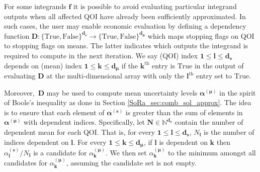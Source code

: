 \documentclass[graybox]{svmult}
\begin{document}
For some integrands $\boldsymbol{f}$ it is possible to avoid evaluating particular integrand outputs when all affected QOI have already been sufficiently approximated. In such cases, the user may enable economic evaluation by defining a dependency function $\boldsymbol{D}: \{\text{True},\text{False}\}^{\boldsymbol{d}_{\boldsymbol{s}}} \to \{\text{True},\text{False}\}^{\boldsymbol{d}_{\boldsymbol{\mu}}}$ which maps stopping flags on QOI to stopping flags on means. The latter indicates which outputs the integrand is required to compute in the next iteration.  We say (QOI) index $\boldsymbol{1} \leq \boldsymbol{l} \leq \boldsymbol{d}_{\boldsymbol{s}}$ depends on (mean) index $\boldsymbol{1} \leq \boldsymbol{k} \leq \boldsymbol{d}_{\boldsymbol{\mu}}$ if the $\boldsymbol{k}^\text{th}$ entry is $\text{True}$ in the output of evaluating $\boldsymbol{D}$ at the multi-dimensional array with only the $\boldsymbol{l}^\text{th}$ entry set to $\text{True}$.

Moreover, $\,\boldsymbol{D}$ may be used to compute mean uncertainty levels $\boldsymbol{\alpha}^{(\boldsymbol{\mu})}$ in the spirit of Boole's inequality as done in Section \ref{SoRa_sec:comb_sol_approx}. The idea is to ensure that each element of $\boldsymbol{\alpha}^{(\boldsymbol{s})}$ is greater than the sum of elements in $\boldsymbol{\alpha}^{(\boldsymbol{\mu})}$ with dependent indices. Specifically, let $\boldsymbol{N} \in \mathbb{N}^{\boldsymbol{d}_{\boldsymbol{s}}}$ contain the number of dependent mean for each QOI. That is, for every $\boldsymbol{1} \leq \boldsymbol{l} \leq \boldsymbol{d}_{\boldsymbol{s}}$, $N_{\boldsymbol{l}}$ is the number of indices dependent on $\boldsymbol{l}$. For every $\boldsymbol{1} \leq \boldsymbol{k} \leq \boldsymbol{d}_{\boldsymbol{\mu}}$, if $\boldsymbol{l}$ is dependent on $\boldsymbol{k}$ then $\alpha_{\boldsymbol{l}}^{(\boldsymbol{s})}/N_{\boldsymbol{l}}$ is a candidate for $\alpha_{\boldsymbol{k}}^{(\boldsymbol{\mu})}$. We then set $\alpha_{\boldsymbol{k}}^{(\boldsymbol{\mu})}$ to the minimum amongst all candidates for $\alpha_{\boldsymbol{k}}^{(\boldsymbol{\mu})}$, assuming the candidate set is not empty.
\end{document}
